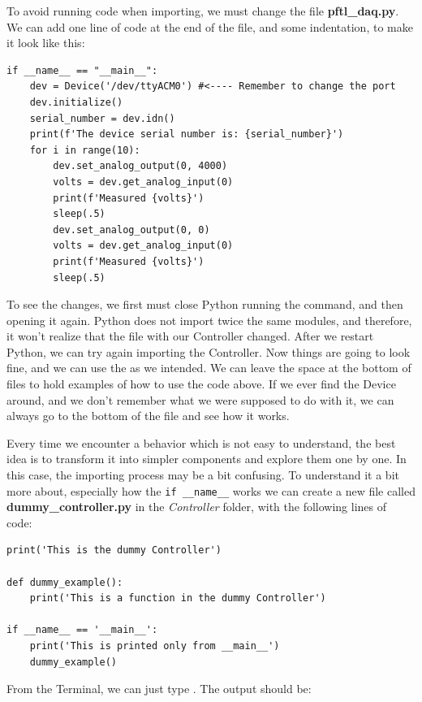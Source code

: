 To avoid running code when importing, we must change the file \textbf{pftl\_daq.py}. We can add one line of code at the end of the file, and some indentation, to make it look like this:

\begin{verbatim}
if __name__ == "__main__":
    dev = Device('/dev/ttyACM0') #<---- Remember to change the port
    dev.initialize()
    serial_number = dev.idn()
    print(f'The device serial number is: {serial_number}')
    for i in range(10):
        dev.set_analog_output(0, 4000)
        volts = dev.get_analog_input(0)
        print(f'Measured {volts}')
        sleep(.5)
        dev.set_analog_output(0, 0)
        volts = dev.get_analog_input(0)
        print(f'Measured {volts}')
        sleep(.5)
\end{verbatim}

To see the changes, we first must close Python running the  command, and then opening it again. Python does not import twice the same modules, and therefore, it won't realize that the file with our Controller changed. After we restart Python, we can try again importing the Controller. Now things are going to look fine, and we can use the  as we intended. We can leave the space at the bottom of files to hold examples of how to use the code above. If we ever find the Device around, and we don't remember what we were supposed to do with it, we can always go to the bottom of the file and see how it works.

Every time we encounter a behavior which is not easy to understand, the best idea is to transform it into simpler components and explore them one by one. In this case, the importing process may be a bit confusing. To understand it a bit more about, especially how the \texttt{if __name__} works we can create a new file called \textbf{dummy\_controller.py} in the \emph{Controller} folder, with the following lines of code:

\begin{verbatim}
print('This is the dummy Controller')

def dummy_example():
    print('This is a function in the dummy Controller')

if __name__ == '__main__':
    print('This is printed only from __main__')
    dummy_example()

\end{verbatim}

\sloppy From the Terminal, we can just type . The output should be:

